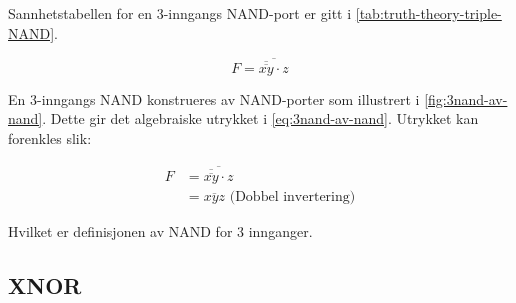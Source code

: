 \documentclass[11pt,a4paper,twocolumn]{article}
\begin{document}
Sannhetstabellen for en 3-inngangs NAND-port er gitt i \cref{tab:truth-theory-triple-NAND}.

\bigskip
\bigskip
\bigskip
\bigskip
\bigskip
\bigskip
\bigskip
\bigskip
\bigskip
\bigskip
\bigskip
\bigskip
\bigskip
\bigskip

\begin{equation}
\label{eq:3nand-av-nand}
F = \overline{\overline{\overline{xy}} \cdot z}
\end{equation}

En 3-inngangs NAND konstrueres av NAND-porter som illustrert i \cref{fig:3nand-av-nand}. Dette gir det algebraiske utrykket i \cref{eq:3nand-av-nand}. Utrykket kan forenkles slik:

$$
\begin{aligned}
F &= \overline{\overline{\overline{xy}} \cdot z} \\
&= \overline{xyz} \text{ (Dobbel invertering)}
\end{aligned}
$$

Hvilket er definisjonen av NAND for 3 innganger.

\subsection{XNOR}
\end{document}
